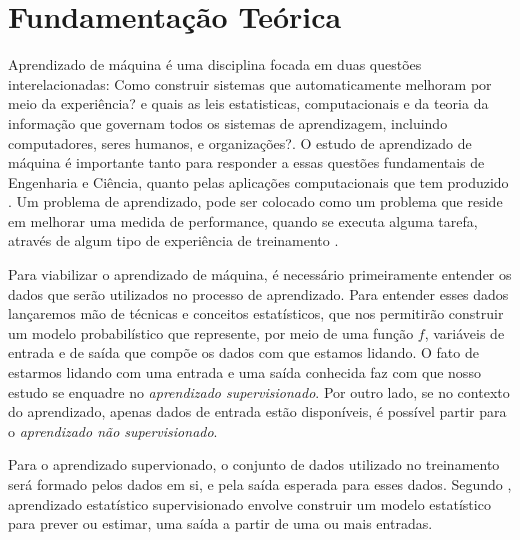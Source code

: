 \chapter{Fundamentação Teórica}

Aprendizado de máquina é uma disciplina focada em duas questões interelacionadas: Como construir sistemas que automaticamente melhoram por meio da experiência? e quais as leis estatisticas,
computacionais e da teoria da informação que governam todos os sistemas de aprendizagem, incluindo computadores, seres humanos, e organizações?. O estudo de aprendizado de máquina é importante tanto
para responder a essas questões fundamentais de Engenharia e Ciência, quanto pelas aplicações computacionais que tem produzido \cite{Jordan}.
Um problema de aprendizado, pode ser colocado como um problema que reside em melhorar uma medida de performance, quando se executa alguma tarefa, através de algum tipo de experiência de treinamento \cite{Jordan}.

Para viabilizar o aprendizado de máquina, é necessário primeiramente entender os dados que serão utilizados no processo de aprendizado. Para entender esses dados
lançaremos mão de técnicas e conceitos estatísticos, que nos permitirão construir um modelo probabilístico que represente, por meio de uma função $f$, variáveis de entrada e de saída que compõe os dados com que estamos lidando. O fato de estarmos lidando com uma entrada e uma saída conhecida faz com que nosso estudo se enquadre no \textit{aprendizado supervisionado}. Por outro lado, se no contexto do aprendizado, apenas dados de entrada estão disponíveis, é possível partir para o \textit{aprendizado não supervisionado}.

Para o aprendizado supervionado, o conjunto de dados utilizado no treinamento será formado pelos dados em si, e pela saída esperada para esses dados\cite{Louridas}. Segundo \cite{James}, aprendizado estatístico supervisionado envolve construir um modelo estatístico para prever ou estimar, uma saída a partir de uma ou mais entradas.



